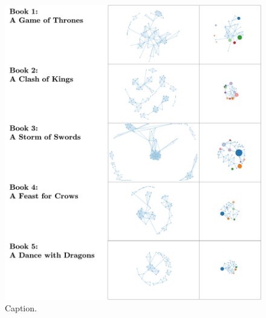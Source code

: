 \documentclass{article}\usepackage[]{graphicx}\usepackage[]{color}
\begin{document}
\begin{figure}[H]
\centering
\includegraphics[width=\textwidth]{images/further_got.png}
\caption{\label{fig:further_got} Caption.}
\end{figure}


\printbibliography
\end{document}
